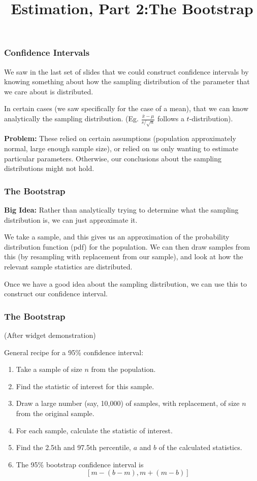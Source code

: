 \documentclass[11pt, table]{beamer}
\begin{document}
	\title{Estimation, Part 2:\newline The Bootstrap}
	\date{}
	\begin{frame}[plain]
	\maketitle
\end{frame}

\begin{frame}
\frametitle{Confidence Intervals}
We saw in the last set of slides that we could construct confidence intervals by knowing something about how the sampling distribution of the parameter that we care about is distributed.
\vspace{0.2in}

In certain cases (we saw specifically for the case of a mean), that we can know analytically the sampling distribution. (Eg. $\frac{\bar{x} - \mu}{s / \sqrt{n}}$ follows a $t$-distribution).
\vspace{0.2in}

\textbf{Problem:} These relied on certain assumptions (population approximately normal, large enough sample size), or relied on us only wanting to estimate particular parameters. Otherwise, our conclusions about the sampling distributions might not hold.
\end{frame}

\begin{frame}
\frametitle{The Bootstrap}
\textbf{Big Idea:} Rather than analytically trying to determine what the sampling distribution is, we can just approximate it.
\vspace{0.2in}

We take a sample, and this gives us an approximation of the probability distribution function (pdf) for the population. We can then draw samples from this (by resampling with replacement from our sample), and look at how the relevant sample statistics are distributed.
\vspace{0.2in}

Once we have a good idea about the sampling distribution, we can use this to construct our confidence interval.
\end{frame}

\begin{frame}
\frametitle{The Bootstrap}
(After widget demonstration)

General recipe for a 95\% confidence interval:
\begin{enumerate}
	\item Take a sample of size $n$ from the population.
	\item Find the statistic of interest for this sample.
	\item Draw a large number (say, 10,000) of samples, with replacement, of size $n$ from the original sample.
	\item For each sample, calculate the statistic of interest. 
	\item Find the 2.5th and 97.5th percentile, $a$ and $b$ of the calculated statistics.
	\item The 95\% bootstrap confidence interval is
$$[m - (b - m), m + (m - b)]$$
\end{enumerate}
\end{frame}
\end{document}
